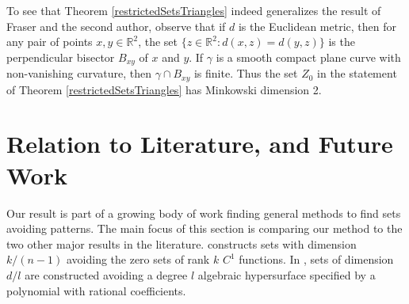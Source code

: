 \documentclass[usenames,dvipsnames,letterpaper, reqno,11pt]{article}
\theoremstyle{plain}
\theoremstyle{plain}
\newtheorem*{remark}{Remark}
\newcommand{\RR}{\mathbb{R}}
\begin{document}
To see that Theorem \ref{restrictedSetsTriangles} indeed generalizes the result of Fraser and the second author, observe that if $d$ is the Euclidean metric, then for any pair of points $x,y\in\RR^2$, the set $\{z\in\RR^2\colon d(x,z)=d(y,z)\}$ is the perpendicular bisector $B_{xy}$ of $x$ and $y$. If $\gamma$ is a smooth compact plane curve with non-vanishing curvature, then $\gamma\cap B_{xy}$ is finite. Thus the set $Z_0$ in the statement of Theorem \ref{restrictedSetsTriangles} has Minkowski dimension 2. 







\section{Relation to Literature, and Future Work}\label{futureWorkSection}

Our result is part of a growing body of work finding general methods to find sets avoiding patterns. The main focus of this section is comparing our method to the two other major results in the literature. \cite{MalabikaRob} constructs sets with dimension $k/(n-1)$ avoiding the zero sets of rank $k$ $C^1$ functions. In \cite{Mathe}, sets of dimension $d/l$ are constructed avoiding a degree $l$ algebraic hypersurface specified by a polynomial with rational coefficients.
\end{document}
